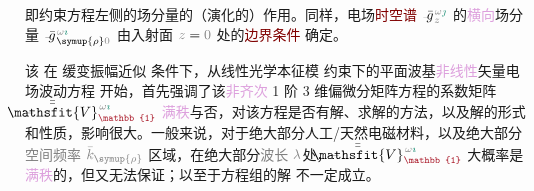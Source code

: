 即约束方程左侧的场分量的（演化的）作用。同样，电场\textcolor{Maroon}{时空谱} $\Xint{{}^{}_{\mathcolor{gray}{-}}}{10}{\bar{g}}^{\;\!\mathcolor{gray}{\omega} \textcolor{PineGreen}{\jmath}}_{\;\! \mathcolor{gray}{z}}$ 的\textcolor{Plum}{横向}场分量 $\Xint{{}^{}_{\mathcolor{gray}{-}}}{10}{\bar{g}}^{\;\!\mathcolor{gray}{\omega} \textcolor{PineGreen}{\imath}}_{\;\! \symup{\rho} \mathcolor{gray}{0}}$ 由入射面 $\mathcolor{gray}{z \mathcolor{black}{=} 0}$ 处的\textcolor{Maroon}{边界条件}  确定。

该  在 \textcolor{NavyBlue}{缓变振幅近似} 条件下，从\textcolor{PineGreen}{线性光学本征模}  约束下的\textcolor{PineGreen}{平面波基}\textcolor{Plum}{非线性}矢量电场波动方程  开始，首先强调了该\textcolor{Plum}{非齐次} 1 阶 3 维偏微分矩阵方程的系数矩阵 $\Xint{\mathcolor{gray}{-}}{25}{\bar{\bar{\mathsfit{V}}}}^{\;\! \mathcolor{gray}{\omega} \textcolor{PineGreen}{\imath}}_{\textcolor{Maroon}{\mathbb{1}}}$ \textcolor{Plum}{满秩}与否，对该方程是否有解、求解的方法，以及解的形式和性质，影响很大。一般来说，对于绝大部分人工/天然电磁材料，以及绝大部分\textcolor{gray}{空间频率} $\mathcolor{gray}{\bar{k}_{\symup{\rho}}}$ 区域，在绝大部分\textcolor{gray}{波长} $\mathcolor{gray}{\lambda}$处，$\Xint{\mathcolor{gray}{-}}{25}{\bar{\bar{\mathsfit{V}}}}^{\;\! \mathcolor{gray}{\omega} \textcolor{PineGreen}{\imath}}_{\textcolor{Maroon}{\mathbb{1}}}$ 大概率是\textcolor{Plum}{满秩}的，但又无法保证；以至于方程组的解  不一定成立。

